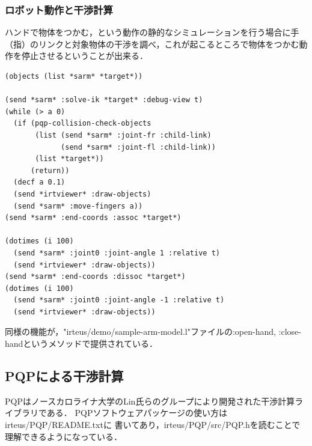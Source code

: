\subsubsection{ロボット動作と干渉計算}
ハンドで物体をつかむ，という動作の静的なシミュレーションを行う場合に手（指）のリンクと対象物体の干渉を調べ，これが起こるところで物体をつかむ動作を停止させるということが出来る．

{\baselineskip=10pt
\begin{verbatim}
(objects (list *sarm* *target*))

(send *sarm* :solve-ik *target* :debug-view t)
(while (> a 0)
  (if (pqp-collision-check-objects
       (list (send *sarm* :joint-fr :child-link)
             (send *sarm* :joint-fl :child-link))
       (list *target*))
      (return))
  (decf a 0.1)
  (send *irtviewer* :draw-objects)
  (send *sarm* :move-fingers a))
(send *sarm* :end-coords :assoc *target*)

(dotimes (i 100)
  (send *sarm* :joint0 :joint-angle 1 :relative t)
  (send *irtviewer* :draw-objects))
(send *sarm* :end-coords :dissoc *target*)
(dotimes (i 100)
  (send *sarm* :joint0 :joint-angle -1 :relative t)
  (send *irtviewer* :draw-objects))
\end{verbatim}
}

同様の機能が，"irteus/demo/sample-arm-model.l"ファイルの:open-hand,
:close-handというメソッドで提供されている．

\subsection{PQPによる干渉計算}

PQPはノースカロライナ大学のLin氏らのグループにより開発された干渉計算ライブラリである．
PQPソフトウェアパッケージの使い方はirteus/PQP/README.txtに
書いてあり，irteus/PQP/src/PQP.hを読むことで理解できるようになっている．

